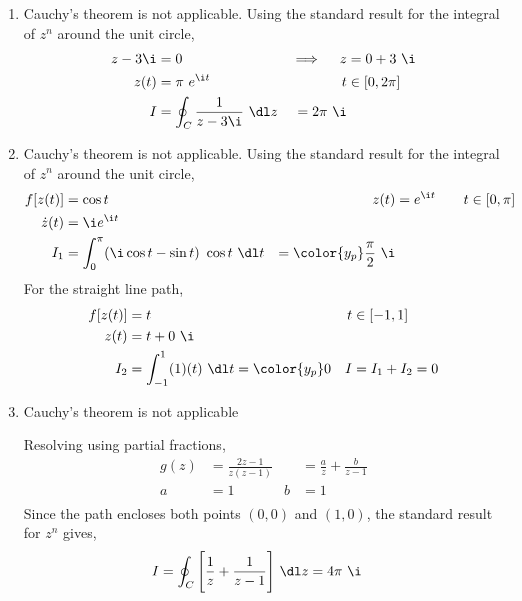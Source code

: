 \begin{enumerate}
    \item Cauchy's theorem \textcolor{y_p}{is not applicable}. Using the standard result
          for the integral of $ z^n $ around the unit circle,
          \begin{align}
              z - 3\i          & = 0                                   &
              \implies \quad z & = 0 + 3\ \i                             \\
              z(t)             & = \pi\ e^{\i t}                       &
              t                & \in [0, 2\pi]                           \\
              I                & = \oint_{C} \frac{1}{z - 3\i} \ \dl z
                               & = 2\pi\ \i
          \end{align}

    \item Cauchy's theorem \textcolor{y_p}{is not applicable}. Using the standard result
          for the integral of $ z^n $ around the unit circle,
          \begin{align}
              f[z(t)]    & = \cos t                                             &
              z(t)       & = e^{\i t} \qquad t \in [0, \pi]                       \\
              \dot{z}(t) & = \i e^{\i t}                                          \\
              I_1        & = \int_{0}^{\pi} (\i \cos t - \sin t)\ \cos t\ \dl t
                         & = \color{y_p} \frac{\pi}{2}\ \i
          \end{align}
          For the straight line path,
          \begin{align}
              f[z(t)] & = t                                           &
              t       & \in [-1, 1]                                     \\
              z(t)    & = t + 0\ \i                                     \\
              I_2     & = \int_{-1}^{1} (1)(t)\ \dl t = \color{y_p} 0 &
              I       & = I_1 + I_2 = 0
          \end{align}

    \item Cauchy's theorem \textcolor{y_p}{is not applicable} \par
          Resolving using partial fractions,
          \begin{align}
              g(z) & = \frac{2z - 1}{z(z-1)}       &
                   & = \frac{a}{z} + \frac{b}{z-1}   \\
              a    & = 1                           &
              b    & = 1                             \\
          \end{align}
          Since the path encloses both points $ (0, 0) $ and $ (1, 0) $, the standard
          result for $ z^n $ gives,
          \begin{align}
              I & = \oint_{C} \Bigg[\frac{1}{z} + \frac{1}{z-1}\Bigg]\ \dl z
              = 4\pi\ \i
          \end{align}


\end{enumerate}
